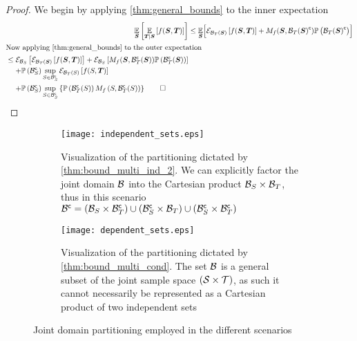\begin{proof}
	We begin by applying \cref{thm:general_bounds} to the inner expectation
	\begin{align*}
		\expectation{\expectation{f(\RV,\RVI)}{\RVI\mid\RV}}{\RV} & \leq \E_{\RV}\Bigl[\partialexpectation{f(\RV,\RVI)}{\subSpaceI{\variableI}(\RV)}+M_f(\RV,\stcomp{\subSpaceI{\variableI}(\RV)})\measure{\stcomp{\subSpaceI{\variableI}(\RV)}}\Bigr]\\
		\intertext{Now applying \cref{thm:general_bounds} to the outer expectation}
		\begin{split}
			&\leq\partialexpectation{\partialexpectation{f(\RV,\RVI)}{\subSpaceI{\variableI}(\RV)}}{\subSpaceI{\variable}}
			+\partialexpectation{M_f(\RV,\stcompI{\subSpace}{\variableI}(\RV))\measure{\stcompI{\subSpace}{\variableI}(\RV)}}{\subSpaceI{\variable}}
			\\
			& \phantomeq+\measure{\stcompI{\subSpace}{\variable}}\sup_{\variable\in\stcompI{\subSpace}{\variable}}\partialexpectation{f(\variable,\RVI)}{\subSpaceI{\variableI}(\variable)}\\
			&\phantomeq
			+\measure{\stcompI{\subSpace}{\variable}}\sup_{\variable\in\stcompI{\subSpace}{\variable}}\left\{\measure{\stcompI{\subSpace}{\variableI}(\variable)}M_f\left(\variable,\stcompI{\subSpace}{\variableI}(\variable)\right)\right\}\qed
		\end{split}
	\end{align*}
\end{proof}

\begin{figure*} [h]
	\centering
	\begin{subfigure}[t]{0.45\textwidth}
		\centering
		\texttt{[image: independent\_sets.eps]}
		\caption{Visualization of the partitioning dictated by \autoref{thm:bound_multi_ind_2}. We can explicitly factor the joint domain $\mathcal B$ into the Cartesian product $\mathcal{B}_{S}\times\mathcal{B}_{T}$, thus in this scenario ${\mathcal B}^{\mathsf{c}}=\left(\mathcal{B}_{S}\times{\ensuremath{\mathcal B}}^{\mathsf{c}}_{T}\right)\cup\left({\mathcal B}^{\mathsf{c}}_{S}\times\mathcal{B}_{T}\right)\cup\left({\mathcal B}^{\mathsf{c}}_{S}\times{\ensuremath{\mathcal B}}^{\mathsf{c}}_{T}\right)$}
		\label{fig:ind_sets}
	\end{subfigure}
	\hfill
	\begin{subfigure}[t]{0.45\textwidth}
		\centering
		\texttt{[image: dependent\_sets.eps]}
		\caption{Visualization of the partitioning dictated by \autoref{thm:bound_multi_cond}. The set $\mathcal B$ is a general subset of the joint sample space $(\mathcal S\times\mathcal T)$, as such it cannot necessarily be represented as a Cartesian product of two independent sets}
		\label{fig:dep_sets}
	\end{subfigure}
	\caption{Joint domain partitioning employed in the different scenarios}
	\label{fig:sets}
\end{figure*}

